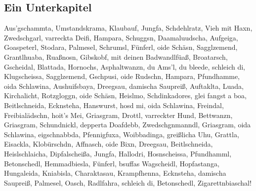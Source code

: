 \subsection{Ein Unterkapitel}
\label{sec:Ein Unterkapitel}
Aus’gschammta, Umstandskrama, Klaubauf, Jungfa, Schdehlratz, Vieh mit Haxn, Zwedschgarl, varreckta Deifi, Hampara, Schuggsn, Daamaluudscha, Aufgeiga, Goaspeterl, Stodara, Palmesel, Schrumsl, Fünferl, oide Schäsn, Sagglzemend, Grantlhuaba, Ruaßnosn, Gibskobf, mit deinen Badwandlfüaß, Broatarsch, Gscheidal, Blattada, Hornochs, Asphaltwanzn, du Ams’l, du bleede, schleich di, Klugscheissa, Sagglzemend, Gschpusi, oide Rudschn, Hampara, Pfundhamme, oida Schlawina, Aushuifsbaya, Dreegsau, damischa Saupreiß, Auftaklta, Luada, Kirchalicht, Rotzgloggn, oide Schäsn, Heislmo, Schdinkadores, glei fangst a boa, Beitlschneida, Ecknsteha, Hanswurst, hosd mi, oida Schlawina, Freindal, Freibialädschn, hoit’s Mei, Griasgram, Drottl, varreckter Hund, Bettwanzn, Griasgram, Schundnickl, depperta Doafdebb, Zwedschgnmanndl, Griasgram, oida Schlawina, eigschnabbda, Pfennigfuxa, Woibbadinga, greißlicha Uhu, Grattla, Eisackla, Klobürschdn, Affnasch, oide Bixn, Dreegsau, Beitlschneida, Heislschlaicha, Dipfalscheißa, Jungfa, Hallodri, Hosnscheissa, Pfundhamml, Betonschedl, Hemmadbiesla, Fünferl, bsuffas Wagscheidl, Hopfastanga, Hungaleida, Kniabisla, Charaktasau, Krampfhenna, Ecknsteha, damischa Saupreiß, Palmesel, Oasch, Radlfahra, schleich di, Betonschedl, Zigarettnbiaschal!\autocite[Vgl.][]{BavariaIpsum} 

\autocite{BavariaIpsum}

